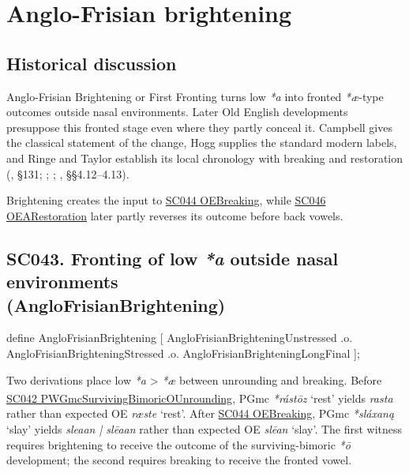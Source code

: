 \documentclass[
  british,
  a4paper,
  openany]{book}
\providecommand{\Pred}[1]{\textsuperscript{\dag}\emph{#1}}
\providecommand{\Recon}[1]{\emph{*#1}}
{\catcode`→=\active \global\def→{\ensuremath{\rightarrow}}}
\providecommand{\texorpdfstring}[2]{#1}
\DeclareRobustCommand{\CAPRRuleHeading}[2]{%
  #1\texorpdfstring{\\(#2)}{ (#2)}%
}
\providecommand{\Pred}[1]{\textsuperscript{\dag}\emph{#1}}
\providecommand{\Recon}[1]{\emph{*#1}}
{\catcode`→=\active \global\def→{\ensuremath{\rightarrow}}}
\begin{document}
\newpage

\section{Anglo-Frisian brightening}\label{anglo-frisian-brightening}

\subsection{Historical discussion}\label{historical-discussion-25}

Anglo-Frisian Brightening or First Fronting turns low \emph{*a} into
fronted \emph{*æ}-type outcomes outside nasal environments. Later Old
English developments presuppose this fronted stage even where they
partly conceal it. Campbell gives the classical statement of the change,
Hogg supplies the standard modern labels, and Ringe and Taylor establish
its local chronology with breaking and restoration
(, §131;
;
;
, §§4.12--4.13).

Brightening creates the input to \hyperref[rule-OEBreaking]{SC044
OEBreaking}, while \hyperref[rule-OEARestoration]{SC046 OEARestoration}
later partly reverses its outcome before back vowels.

\subsection{\texorpdfstring{\CAPRRuleHeading{SC043. Fronting of low \emph{*a} outside nasal environments}{AngloFrisianBrightening}}{}}\label{rule-AngloFrisianBrightening}

\begin{ReaderFacingFoma}
define AngloFrisianBrightening [
    AngloFrisianBrighteningUnstressed .o.
    AngloFrisianBrighteningStressed .o.
    AngloFrisianBrighteningLongFinal
];
\end{ReaderFacingFoma}

Two derivations place low \emph{*a} \textgreater{} \emph{*æ} between
unrounding and breaking. Before
\hyperref[rule-PWGmcSurvivingBimoricOUnrounding]{SC042
PWGmcSurvivingBimoricOUnrounding}, PGmc \Recon{rástōz} `rest' yields
\Pred{rasta} rather than expected OE \emph{ræste} `rest'. After
\hyperref[rule-OEBreaking]{SC044 OEBreaking}, PGmc \Recon{sláxaną}
`slay' yields \emph{sleaan | slēaan} rather than expected OE
\emph{slēan} `slay'. The first witness requires brightening to receive
the outcome of the surviving-bimoric \emph{*ō} development; the second
requires breaking to receive the fronted vowel.
\end{document}
